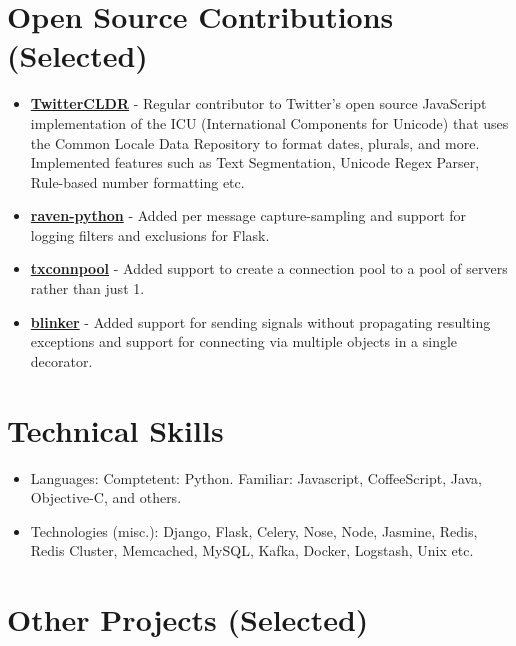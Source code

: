 \section{Open Source Contributions
(Selected)}\label{open-source-contributions-selected}

\begin{itemize}
\tightlist
\item
  \href{https://github.com/twitter/twitter-cldr-js}{\textbf{TwitterCLDR}}
  - Regular contributor to Twitter's open source JavaScript
  implementation of the ICU (International Components for Unicode) that
  uses the Common Locale Data Repository to format dates, plurals, and
  more. Implemented features such as Text Segmentation, Unicode Regex
  Parser, Rule-based number formatting etc.
\item
  \href{https://github.com/getsentry/raven-python}{\textbf{raven-python}}
  - Added per message capture-sampling and support for logging filters
  and exclusions for Flask.
\item
  \href{https://github.com/zopim/txconnpool}{\textbf{txconnpool}} -
  Added support to create a connection pool to a pool of servers rather
  than just 1.
\item
  \href{https://github.com/zopim/blinker}{\textbf{blinker}} - Added
  support for sending signals without propagating resulting exceptions
  and support for connecting via multiple objects in a single decorator.
\end{itemize}

\section{Technical Skills}\label{technical-skills}

\begin{itemize}
\tightlist
\item
  Languages: Comptetent: Python. Familiar: Javascript, CoffeeScript,
  Java, Objective-C, and others.
\item
  Technologies (misc.): Django, Flask, Celery, Nose, Node, Jasmine,
  Redis, Redis Cluster, Memcached, MySQL, Kafka, Docker, Logstash, Unix
  etc.
\end{itemize}

\section{Other Projects (Selected)}\label{other-projects-selected}

